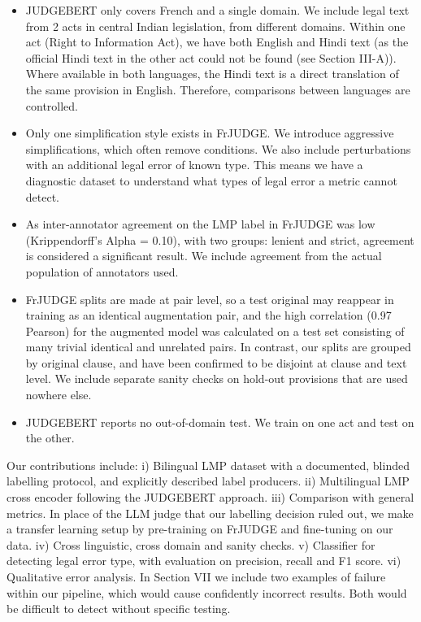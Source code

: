 \documentclass[conference]{IEEEtran}
\begin{document}
\begin{itemize}
\item JUDGEBERT only covers French and a single domain. We include legal text from 2 acts in central Indian legislation, from different domains. Within one act (Right to Information Act), we have both English and Hindi text (as the official Hindi text in the other act could not be found (see Section III-A)). Where available in both languages, the Hindi text is a direct translation of the same provision in English. Therefore, comparisons between languages are controlled.
\item Only one simplification style exists in FrJUDGE. We introduce aggressive simplifications, which often remove conditions. We also include perturbations with an additional legal error of known type. This means we have a diagnostic dataset to understand what types of legal error a metric cannot detect.
\item As inter-annotator agreement on the LMP label in FrJUDGE was low (Krippendorff’s Alpha = 0.10), with two groups: lenient and strict, agreement is considered a significant result. We include agreement from the actual population of annotators used.
\item FrJUDGE splits are made at pair level, so a test original may reappear in training as an identical augmentation pair, and the high correlation (0.97 Pearson) for the augmented model was calculated on a test set consisting of many trivial identical and unrelated pairs. In contrast, our splits are grouped by original clause, and have been confirmed to be disjoint at clause and text level. We include separate sanity checks on hold-out provisions that are used nowhere else.
\item JUDGEBERT reports no out-of-domain test. We train on one act and test on the other.
\end{itemize}

Our contributions include: i) Bilingual LMP dataset with a documented, blinded labelling protocol, and explicitly described label producers. ii) Multilingual LMP cross encoder following the JUDGEBERT approach. iii) Comparison with general metrics. In place of the LLM judge that our labelling decision ruled out, we make a transfer learning setup by pre-training on FrJUDGE and fine-tuning on our data. iv) Cross linguistic, cross domain and sanity checks. v) Classifier for detecting legal error type, with evaluation on precision, recall and F1 score. vi) Qualitative error analysis. In Section VII we include two examples of failure within our pipeline, which would cause confidently incorrect results. Both would be difficult to detect without specific testing.
\end{document}
